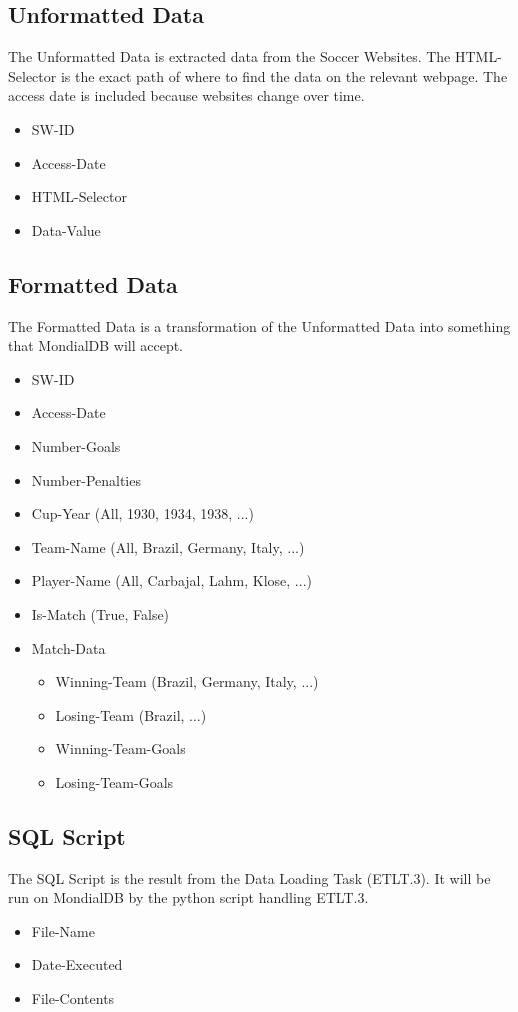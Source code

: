 \documentclass{article}
\begin{document}
\subsection{Unformatted Data}
The Unformatted Data is extracted data from the Soccer Websites. 
The HTML-Selector is the exact path of where to find the data on the
relevant webpage. The access date is included because websites change over time.
\begin{itemize}
	\item SW-ID
	\item Access-Date
	\item HTML-Selector
	\item Data-Value
\end{itemize}

\subsection{Formatted Data}
The Formatted Data is a transformation of the Unformatted Data into
something that MondialDB will accept. 

\begin{itemize}
	\item SW-ID
	\item Access-Date
	\item Number-Goals
	\item Number-Penalties
	\item Cup-Year (All, 1930, 1934, 1938, ...)
	\item Team-Name (All, Brazil, Germany, Italy, ...)
	\item Player-Name (All, Carbajal, Lahm, Klose, ...)
	\item Is-Match (True, False)
	\item Match-Data
	\begin{itemize}
		\item Winning-Team (Brazil, Germany, Italy, ...)
		\item Losing-Team (Brazil, ...)
		\item Winning-Team-Goals
		\item Losing-Team-Goals
	\end{itemize}
\end{itemize}

\subsection{SQL Script}
The SQL Script is the result from the Data Loading Task (ETLT.3).
It will be run on MondialDB by the python script handling ETLT.3.
\begin{itemize}
	\item File-Name 
	\item Date-Executed
	\item File-Contents
\end{itemize} 
\end{document}

